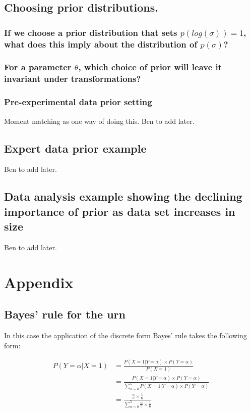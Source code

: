 \documentclass[11pt,fullpage]{book}
\begin{document}
\subsection{Choosing prior distributions.}
\subsubsection{If we choose a prior distribution that sets $p(log(\sigma))=1$, what does this imply about the distribution of $p(\sigma)$?}

\subsubsection{For a parameter $\theta$, which choice of prior will leave it invariant under transformations?}

\subsubsection{Pre-experimental data prior setting}
Moment matching as one way of doing this. Ben to add later.

\subsection{Expert data prior example}
Ben to add later.

\subsection{Data analysis example showing the declining importance of prior as data set increases in size}
Ben to add later.

\section{Appendix}
\subsection{Bayes' rule for the urn}\label{app:Prior_bayesUrn}
In this case the application of the discrete form Bayes' rule takes the following form:

\begin{equation}\label{eq:Prior_bayesDiscreteForm}
\begin{align}
P(Y=\alpha|X=1) &= \frac{P(X=1|Y=\alpha)\times P(Y=\alpha)}{P(X=1)}\\
&= \frac{P(X=1|Y=\alpha)\times P(Y=\alpha)}{\sum\limits_{\alpha=0}^{5}P(X=1|Y=\alpha)\times P(Y=\alpha)}\\
&= \frac{\frac{\alpha}{5}\times \frac{1}{6}}{\sum\limits_{\alpha=0}^{5}\frac{\alpha}{5}\times\frac{1}{6}}
\end{align}
\end{equation}
\end{document}
